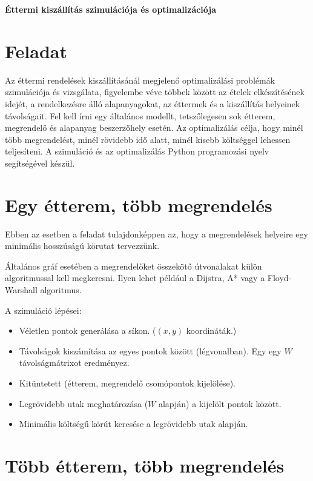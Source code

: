 \documentclass[a4paper]{paper}
\begin{document}
\begin{center}
   \large \textbf{Éttermi kiszállítás szimulációja és optimalizációja}
\end{center}

\vskip 1cm

\section{Feladat}

Az éttermi rendelések kiszállításánál megjelenő optimalizálási problémák szimulációja és vizsgálata, figyelembe véve többek között az ételek elkészítésének idejét, a rendelkezésre álló alapanyagokat, az éttermek és a kiszállítás helyeinek távolságait. Fel kell írni egy általános modellt, tetszőlegesen sok étterem, megrendelő és alapanyag beszerzőhely esetén. Az optimalizálás célja, hogy minél több megrendelést, minél rövidebb idő alatt, minél kisebb költséggel lehessen teljesíteni. A szimuláció és az optimalizálás Python programozási nyelv segítségével készül.

\section{Egy étterem, több megrendelés}

Ebben az esetben a feladat tulajdonképpen az, hogy a megrendelések helyeire egy minimális hosszúságú körutat tervezzünk.

Általános gráf esetében a megrendelőket összekötő útvonalakat külön algoritmussal kell megkeresni. Ilyen lehet például a Dijstra, A* vagy a Floyd-Warshall algoritmus.

A szimuláció lépései:
\begin{itemize}
\item Véletlen pontok generálása a síkon. ($(x, y)$ koordináták.)
\item Távolságok kiszámítása az egyes pontok között (légvonalban). Egy egy $W$ távolságmátrixot eredményez.
\item Kitüntetett (étterem, megrendelő csomópontok kijelölése).
\item Legrövidebb utak meghatározása ($W$ alapján) a kijelölt pontok között.
\item Minimális költségű körút keresése a legrövidebb utak alapján.
\end{itemize}

\section{Több étterem, több megrendelés}
\end{document}
